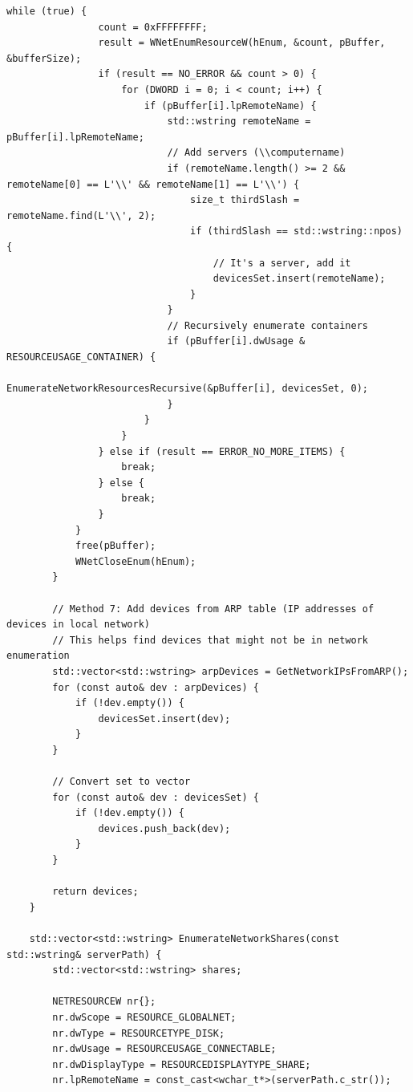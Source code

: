 \begin{lstlisting}[style=CodeListing]
            while (true) {
                count = 0xFFFFFFFF;
                result = WNetEnumResourceW(hEnum, &count, pBuffer, &bufferSize);
                if (result == NO_ERROR && count > 0) {
                    for (DWORD i = 0; i < count; i++) {
                        if (pBuffer[i].lpRemoteName) {
                            std::wstring remoteName = pBuffer[i].lpRemoteName;
                            // Add servers (\\computername)
                            if (remoteName.length() >= 2 && remoteName[0] == L'\\' && remoteName[1] == L'\\') {
                                size_t thirdSlash = remoteName.find(L'\\', 2);
                                if (thirdSlash == std::wstring::npos) {
                                    // It's a server, add it
                                    devicesSet.insert(remoteName);
                                }
                            }
                            // Recursively enumerate containers
                            if (pBuffer[i].dwUsage & RESOURCEUSAGE_CONTAINER) {
                                EnumerateNetworkResourcesRecursive(&pBuffer[i], devicesSet, 0);
                            }
                        }
                    }
                } else if (result == ERROR_NO_MORE_ITEMS) {
                    break;
                } else {
                    break;
                }
            }
            free(pBuffer);
            WNetCloseEnum(hEnum);
        }
        
        // Method 7: Add devices from ARP table (IP addresses of devices in local network)
        // This helps find devices that might not be in network enumeration
        std::vector<std::wstring> arpDevices = GetNetworkIPsFromARP();
        for (const auto& dev : arpDevices) {
            if (!dev.empty()) {
                devicesSet.insert(dev);
            }
        }
        
        // Convert set to vector
        for (const auto& dev : devicesSet) {
            if (!dev.empty()) {
                devices.push_back(dev);
            }
        }
        
        return devices;
    }
    
    std::vector<std::wstring> EnumerateNetworkShares(const std::wstring& serverPath) {
        std::vector<std::wstring> shares;
        
        NETRESOURCEW nr{};
        nr.dwScope = RESOURCE_GLOBALNET;
        nr.dwType = RESOURCETYPE_DISK;
        nr.dwUsage = RESOURCEUSAGE_CONNECTABLE;
        nr.dwDisplayType = RESOURCEDISPLAYTYPE_SHARE;
        nr.lpRemoteName = const_cast<wchar_t*>(serverPath.c_str());
        

\end{lstlisting}
